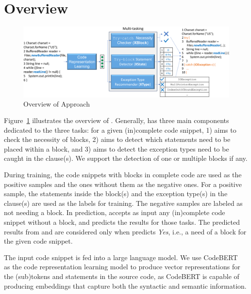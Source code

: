 \section{{\tool} Overview}
\label{sec:overview}

\begin{figure}[t] %
\begin{center}
\includegraphics[width=5.7in]{overview-7.png} %
\vspace{-10pt}
\caption{Overview of {\tool} Approach}
\label{overview}
\end{center}
\end{figure}

Figure~\ref{overview} illustrates the overview of {\tool}. Generally,
{\tool} has three main components dedicated to the three tasks: for a
given (in)complete code snippet, 1) {\xblock} aims to check the
necessity of  blocks, 2) {\xstate} aims to detect which
statements need to be placed within a  block, and 3) {\xtype}
aims to detect the exception types need to be caught in the
 clause(s). We support the detection of one or multiple
 blocks if any.

During training, the code snippets with  blocks in
complete code are used as the positive samples and the ones without
them as the negative ones. For a positive sample, the statements
inside the  block(s) and the exception type(s) in the
 clause(s) are used as the labels for training. The negative
samples are labeled as not needing a  block. In
prediction, {\tool} accepts as input any (in)complete code
snippet without a  block, and predicts the results for
those tasks. The predicted results from {\xstate} and {\xtype} are
considered only when {\xblock} predicts {\em Yes}, i.e., a need of a
 block for the given code snippet.

The input code snippet is fed into a large language model. We use
CodeBERT~\cite{codebert-emnlp20} as the code representation learning
model to produce vector representations for the (sub)tokens and
statements in the source code, as CodeBERT is capable of producing
embeddings that capture both the syntactic and semantic information.

